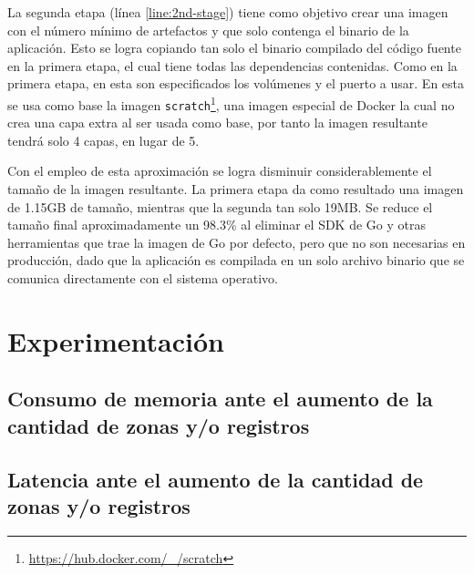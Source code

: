 La segunda etapa (línea \ref{line:2nd-stage}) tiene como objetivo crear una imagen con el número mínimo de artefactos y que solo contenga el binario de la aplicación. Esto se logra copiando tan solo el binario compilado del código fuente en la primera etapa, el cual tiene todas las dependencias contenidas. Como en la primera etapa, en esta son especificados los volúmenes y el puerto  a usar. En esta se usa como base la imagen \verb|scratch|\footnote{\url{https://hub.docker.com/_/scratch}}, una imagen especial de Docker la cual no crea una capa extra al ser usada como base, por tanto la imagen resultante tendrá solo 4 capas, en lugar de 5.

Con el empleo de esta aproximación se logra disminuir considerablemente el tamaño de la imagen resultante. La primera etapa da como resultado una imagen de 1.15GB de tamaño, mientras que la segunda tan solo 19MB. Se reduce el tamaño final aproximadamente un 98.3\% al eliminar el SDK de Go y otras herramientas que trae la imagen de Go por defecto, pero que no son necesarias en producción, dado que la aplicación es compilada en un solo archivo binario que se comunica directamente con el sistema operativo.

\section{Experimentación}

\subsection{Consumo de memoria ante el aumento de la cantidad de zonas y/o registros}

\subsection{Latencia ante el aumento de la cantidad de zonas y/o registros}
